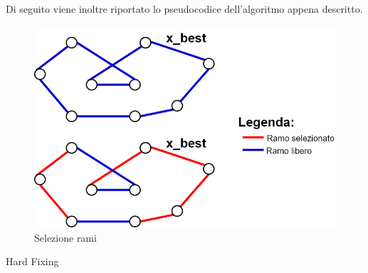 Di seguito viene inoltre riportato lo pseudocodice dell'algoritmo appena descritto.
\begin{figure}[h] 
\begin{center} 
  \includegraphics[scale=0.38]{Images/x_best} 
  \caption{\footnotesize{Selezione rami}}
  \label{selezione_rami} 
\end{center} 
\end{figure}
\begin{algorithm}[h]
\caption{Hard Fixing}
\begin{algorithmic}
\ENDIF
\ENDFOR
{}
\ENDFOR
{}
\ENDWHILE
\end{algorithmic}
\end{algorithm}
\clearpage
